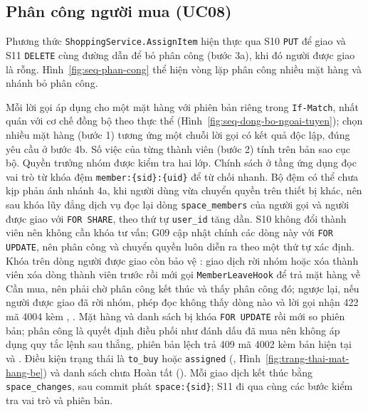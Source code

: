 
\subsection{Phân công người mua (UC08)}\label{sssec:ht-phan-cong}

Phương thức \texttt{ShoppingService.AssignItem} hiện thực  qua S10 \texttt{PUT}  để giao và S11 \texttt{DELETE} cùng đường dẫn để bỏ phân công (bước 3a), khi đó người được giao là rỗng. Hình~\ref{fig:seq-phan-cong} thể hiện vòng lặp phân công nhiều mặt hàng và nhánh bỏ phân công.


Mỗi lời gọi áp dụng cho một mặt hàng với phiên bản riêng trong \texttt{If-Match}, nhất quán với cơ chế đồng bộ theo thực thể (Hình~\ref{fig:seq-dong-bo-ngoai-tuyen}); chọn nhiều mặt hàng (bước 1) tương ứng một chuỗi lời gọi có kết quả độc lập, đúng yêu cầu ở bước 4b. Số việc của từng thành viên (bước 2) tính trên bản sao cục bộ. Quyền trưởng nhóm được kiểm tra hai lớp. Chính sách ở tầng ứng dụng đọc vai trò từ khóa đệm \texttt{member:\{sid\}:\{uid\}} để từ chối nhanh. Bộ đệm có thể chưa kịp phản ánh nhánh 4a, khi người dùng vừa chuyển quyền trên thiết bị khác, nên sau khóa lũy đẳng dịch vụ đọc lại dòng \texttt{space\_members} của người gọi và người được giao với \texttt{FOR SHARE}, theo thứ tự \texttt{user\_id} tăng dần. S10 không đổi thành viên nên không cần khóa tư vấn; G09 cập nhật chính các dòng này với \texttt{FOR UPDATE}, nên phân công và chuyển quyền luôn diễn ra theo một thứ tự xác định. Khóa trên dòng người được giao còn bảo vệ : giao dịch rời nhóm hoặc xóa thành viên xóa dòng thành viên trước rồi mới gọi \texttt{MemberLeaveHook} để trả mặt hàng về Cần mua, nên phải chờ phân công kết thúc và thấy phân công đó; ngược lại, nếu người được giao đã rời nhóm, phép đọc không thấy dòng nào và lời gọi nhận 422 mã 4004 kèm , . Mặt hàng và danh sách bị khóa \texttt{FOR UPDATE} rồi mới so phiên bản; phân công là quyết định điều phối như đánh dấu đã mua nên không áp dụng quy tắc lệnh sau thắng, phiên bản lệch trả 409 mã 4002 kèm bản hiện tại và . Điều kiện trạng thái là \texttt{to\_buy} hoặc \texttt{assigned} (, Hình~\ref{fig:trang-thai-mat-hang-be}) và danh sách chưa Hoàn tất (). Mỗi giao dịch kết thúc bằng \texttt{space\_changes}, sau commit phát \texttt{space:\{sid\}}; S11 đi qua cùng các bước kiểm tra vai trò và phiên bản.

